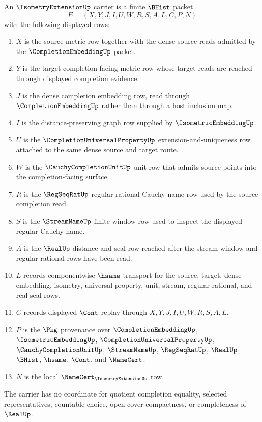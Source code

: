 \begin{definition}
\label{def:isometry-extension-carrier}
An $\IsometryExtensionUp$ carrier is a finite $\BHist$ packet
$$
E=(X,Y,J,I,U,W,R,S,A,L,C,P,N)
$$
with the following displayed rows:
\begin{enumerate}
\item $X$ is the source metric row together with the dense source reads admitted by the $\CompletionEmbeddingUp$ packet.
\item $Y$ is the target completion-facing metric row whose target reads are reached through displayed completion evidence.
\item $J$ is the dense completion embedding row, read through $\CompletionEmbeddingUp$ rather than through a host inclusion map.
\item $I$ is the distance-preserving graph row supplied by $\IsometricEmbeddingUp$.
\item $U$ is the $\CompletionUniversalPropertyUp$ extension-and-uniqueness row attached to the same dense source and target route.
\item $W$ is the $\CauchyCompletionUnitUp$ unit row that admits source points into the completion-facing surface.
\item $R$ is the $\RegSeqRatUp$ regular rational Cauchy name row used by the source completion read.
\item $S$ is the $\StreamNameUp$ finite window row used to inspect the displayed regular Cauchy name.
\item $A$ is the $\RealUp$ distance and seal row reached after the stream-window and regular-rational rows have been read.
\item $L$ records componentwise $\hsame$ transport for the source, target, dense embedding, isometry, universal-property, unit, stream, regular-rational, and real-seal rows.
\item $C$ records displayed $\Cont$ replay through $X,Y,J,I,U,W,R,S,A,L$.
\item $P$ is the $\Pkg$ provenance over $\CompletionEmbeddingUp$, $\IsometricEmbeddingUp$, $\CompletionUniversalPropertyUp$, $\CauchyCompletionUnitUp$, $\StreamNameUp$, $\RegSeqRatUp$, $\RealUp$, $\BHist$, $\hsame$, $\Cont$, and $\NameCert$.
\item $N$ is the local $\NameCert_{\IsometryExtensionUp}$ row.
\end{enumerate}
The carrier has no coordinate for quotient completion equality, selected representatives, countable choice, open-cover compactness, or completeness of $\RealUp$.
\end{definition}

